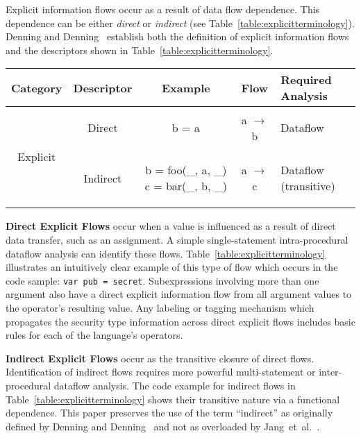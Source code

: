 Explicit information flows occur as a result of data flow dependence.
This dependence can be either \emph{direct} or \emph{indirect} (see Table~\ref{table:explicitterminology}).
Denning and Denning~\cite{denning.denning+77} establish both the definition of explicit information flows and the descriptors shown in Table~\ref{table:explicitterminology}.

\begin{table*}[h]
\centering
\begin{tabular}{ccccm{2.5cm}}
\toprule
Category & Descriptor & Example & Flow & Required Analysis \\
\midrule[\heavyrulewidth]
\multirow{3}{*}{Explicit} & Direct &
\begin{js-embed}
b = a
\end{js-embed}
& a $\rightarrow$ b & Dataflow\\
\cmidrule(r){2-5} & Indirect &
\begin{js-embed}
b = foo(_, a, _)
c = bar(_, b, _)
\end{js-embed}
& a $\rightarrow$ c & Dataflow (transitive) \\
\bottomrule
\end{tabular}
\caption{Terminology of Explicit Information Flows.}
\label{table:explicitterminology}
\end{table*}

\begin{description}
\item{
\textbf{Direct Explicit Flows} occur when a value is influenced as a result of direct data transfer, such as an assignment.
A simple single-statement intra-procedural dataflow analysis can identify these flows.
Table~\ref{table:explicitterminology} illustrates an intuitively clear example of this type of flow which occurs in the code sample: \texttt{var pub = secret}.
Subexpressions involving more than one argument also have a direct explicit information flow from all argument values to the operator's resulting value.
Any labeling or tagging mechanism which propagates the security type information across direct explicit flows includes basic rules for each of the language's operators.
}

\item{
\textbf{Indirect Explicit Flows} occur as the transitive closure of direct flows.
Identification of indirect flows requires more powerful multi-statement or inter-procedural dataflow analysis.
The code example for indirect flows in Table~\ref{table:explicitterminology} shows their transitive nature via a functional dependence.
This paper preserves the use of the term ``indirect'' as originally defined by Denning and Denning~\cite{denning.denning+77} and not as overloaded by Jang~et~al.~\cite{jang.etal+10}.
}
\end{description}

